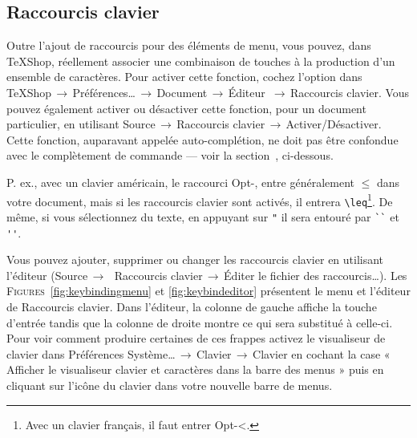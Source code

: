 \documentclass[11pt,french]{article}
\newcommand{\TS}{\textsf{\TeX Shop}}
\newcommand{\cmd}[1]{\textsf{#1}}
\newcommand{\mnu}[1]{\textsf{#1}}
\newcommand{\To}{\,\(\to\)\,}
\begin{document}

\subsection{Raccourcis clavier}

Outre l'ajout de raccourcis pour des éléments de menu, vous pouvez, dans \TS{}, réellement associer une combinaison de touches à la production d'un ensemble de caractères. Pour activer cette fonction, cochez l'option dans  \mnu{TeXShop}\To\mnu{Préférences…}\To\mnu{Document}\To\mnu{Éditeur} \To\mnu{Raccourcis clavier}. Vous pouvez également activer ou désactiver cette fonction, pour un document particulier, en utilisant \mnu{Source}\To\mnu{Raccourcis clavier}\To\mnu{Activer/Désactiver}. Cette fonction, auparavant appelée auto-complétion, ne doit pas être confondue avec le complètement de commande --- voir la section~, ci-dessous.


P. ex., avec un clavier américain, le raccourci \cmd{Opt-,} entre généralement \texttt{\(\leq\)} dans votre document, mais si les raccourcis clavier sont activés, il entrera \verb|\leq|\footnote{Avec un clavier français, il faut entrer \cmd{Opt-<}.}. De même, si vous sélectionnez du texte, en appuyant sur \verb|"| il sera entouré par \verb|``| et \verb|''|.


Vous pouvez ajouter, supprimer ou changer les raccourcis clavier en utilisant l'éditeur (\mnu{Source}\To\ \mnu{Raccourcis clavier}\To\mnu{Éditer le fichier des raccourcis…}). Les \textsc{Figures}~\ref{fig:keybindingmenu} et \ref{fig:keybindeditor} présentent le menu et l'éditeur de \mnu{Raccourcis clavier}. Dans l'éditeur, la colonne de gauche affiche la touche d'entrée tandis que la colonne de droite montre ce qui sera substitué à celle-ci. Pour voir comment produire certaines de ces frappes activez le visualiseur de clavier dans \mnu{Préférences Système…}\To\mnu{Clavier}\To\mnu{Clavier} en cochant la case « \mnu{Afficher le visualiseur clavier et caractères dans la barre des menus} » puis en cliquant sur l'icône du clavier dans votre nouvelle barre de menus.
\end{document}
